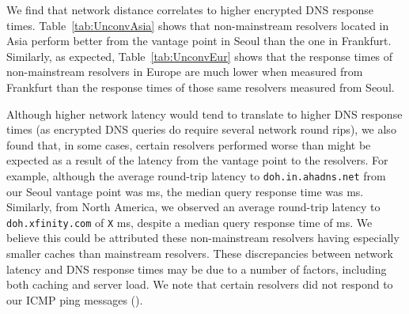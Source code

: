 We find that network distance correlates to higher encrypted DNS response
times.  Table~\ref{tab:UnconvAsia} shows that non-mainstream resolvers located
in Asia perform better from the vantage point in Seoul than the one in
Frankfurt.  Similarly, as expected, Table~\ref{tab:UnconvEur} shows that the
response times of non-mainstream resolvers in Europe are much lower when
measured from Frankfurt than the response times of those same resolvers
measured from Seoul.

Although higher network latency would tend to translate to higher DNS response
times (as encrypted DNS queries do require several network round rips), we
also found that, in some cases, certain resolvers performed worse than might
be expected as a result of the latency from the vantage point to the
resolvers.  For example, although the average round-trip latency to
\texttt{doh.in.ahadns.net} from our Seoul vantage point was  ms, the
median query response time was  ms.  Similarly, from North America, we
observed an average round-trip latency to \texttt{doh.xfinity.com} of
\texttt{X} ms, despite a median query response time of  ms.  We believe
this could be attributed these non-mainstream resolvers having especially
smaller caches than mainstream resolvers.  These discrepancies between network
latency and DNS response times may be due to a number of factors, including
both caching and server load.  We note that certain resolvers did not respond
to our ICMP ping messages ().


